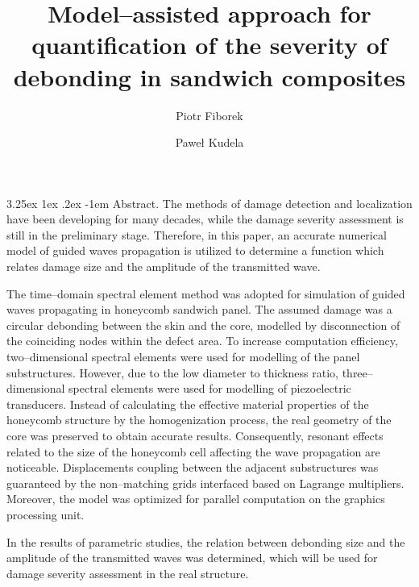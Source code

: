 \documentclass[runningheads]{llncs}
\makeatletter
\renewcommand\paragraph{\@startsection{paragraph}{4}{\z@}%
                                    {3.25ex \@plus1ex \@minus.2ex}%
                                    {-1em}%
                                    {\normalfont\normalsize\bfseries}}
\makeatother
\begin{document}
%
\title{Model--assisted approach for quantification of the severity of debonding in sandwich composites}
%
%
\author{Piotr Fiborek \and
Pawe\l{} Kudela}
%
%
%
\maketitle              %
%
\paragraph{Abstract.}
The methods of damage detection and localization have been developing for many decades, while the damage severity assessment is still in the preliminary stage.  Therefore, in this paper, an accurate numerical model of guided waves propagation is utilized to determine a function which relates damage size and the amplitude of the transmitted wave.

The time--domain spectral element method was adopted for simulation of guided waves propagating in honeycomb sandwich panel. The assumed damage was a circular debonding between the skin and the core, modelled by disconnection of the coinciding nodes within the defect area. To increase computation efficiency, two--dimensional spectral elements were used for modelling of the panel substructures. However, due to the low diameter to thickness ratio, three--dimensional spectral elements were used for modelling of piezoelectric transducers. Instead of calculating the effective material properties of the honeycomb structure by the homogenization process, the real geometry of the core was preserved to obtain accurate results. Consequently, resonant effects related to the size of the honeycomb cell affecting the wave propagation are noticeable. Displacements coupling between the adjacent substructures was guaranteed by the non--matching grids interfaced based on Lagrange multipliers. Moreover, the model was optimized for parallel computation on the graphics processing unit.

In the results of parametric studies, the relation between debonding size and the amplitude of the transmitted waves was determined, which will be used for damage severity assessment in the real structure.

\end{document}
